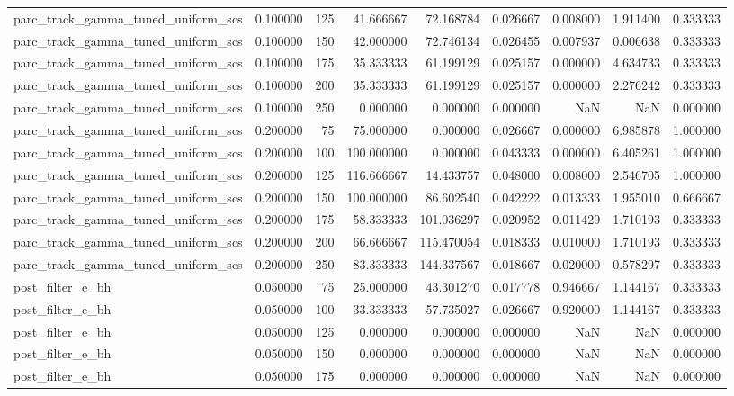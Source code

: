 \begin{tabular}{lrrrrrrrr}
parc_track_gamma_tuned_uniform_scs & 0.100000 & 125 & 41.666667 & 72.168784 & 0.026667 & 0.008000 & 1.911400 & 0.333333 \\
parc_track_gamma_tuned_uniform_scs & 0.100000 & 150 & 42.000000 & 72.746134 & 0.026455 & 0.007937 & 0.006638 & 0.333333 \\
parc_track_gamma_tuned_uniform_scs & 0.100000 & 175 & 35.333333 & 61.199129 & 0.025157 & 0.000000 & 4.634733 & 0.333333 \\
parc_track_gamma_tuned_uniform_scs & 0.100000 & 200 & 35.333333 & 61.199129 & 0.025157 & 0.000000 & 2.276242 & 0.333333 \\
parc_track_gamma_tuned_uniform_scs & 0.100000 & 250 & 0.000000 & 0.000000 & 0.000000 & NaN & NaN & 0.000000 \\
parc_track_gamma_tuned_uniform_scs & 0.200000 & 75 & 75.000000 & 0.000000 & 0.026667 & 0.000000 & 6.985878 & 1.000000 \\
parc_track_gamma_tuned_uniform_scs & 0.200000 & 100 & 100.000000 & 0.000000 & 0.043333 & 0.000000 & 6.405261 & 1.000000 \\
parc_track_gamma_tuned_uniform_scs & 0.200000 & 125 & 116.666667 & 14.433757 & 0.048000 & 0.008000 & 2.546705 & 1.000000 \\
parc_track_gamma_tuned_uniform_scs & 0.200000 & 150 & 100.000000 & 86.602540 & 0.042222 & 0.013333 & 1.955010 & 0.666667 \\
parc_track_gamma_tuned_uniform_scs & 0.200000 & 175 & 58.333333 & 101.036297 & 0.020952 & 0.011429 & 1.710193 & 0.333333 \\
parc_track_gamma_tuned_uniform_scs & 0.200000 & 200 & 66.666667 & 115.470054 & 0.018333 & 0.010000 & 1.710193 & 0.333333 \\
parc_track_gamma_tuned_uniform_scs & 0.200000 & 250 & 83.333333 & 144.337567 & 0.018667 & 0.020000 & 0.578297 & 0.333333 \\
post_filter_e_bh & 0.050000 & 75 & 25.000000 & 43.301270 & 0.017778 & 0.946667 & 1.144167 & 0.333333 \\
post_filter_e_bh & 0.050000 & 100 & 33.333333 & 57.735027 & 0.026667 & 0.920000 & 1.144167 & 0.333333 \\
post_filter_e_bh & 0.050000 & 125 & 0.000000 & 0.000000 & 0.000000 & NaN & NaN & 0.000000 \\
post_filter_e_bh & 0.050000 & 150 & 0.000000 & 0.000000 & 0.000000 & NaN & NaN & 0.000000 \\
post_filter_e_bh & 0.050000 & 175 & 0.000000 & 0.000000 & 0.000000 & NaN & NaN & 0.000000 \\

\end{tabular}
